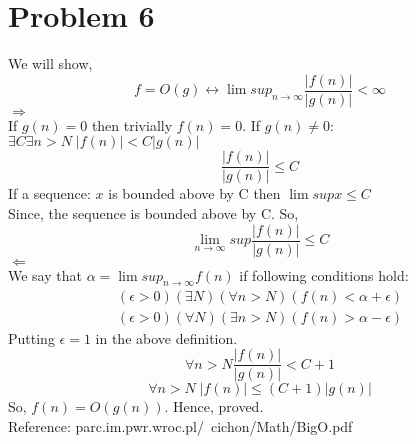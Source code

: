 \documentclass[paper=a4, fontsize=11pt]{scrartcl} %
\numberwithin{equation}{section} %
\numberwithin{figure}{section} %
\numberwithin{table}{section} %
\begin{document}
\section{Problem 6}
We will show, \\
\begin{equation}
	f=O(g)\leftrightarrow \lim sup_{n\rightarrow \infty}\frac{|f(n)|}{|g(n)|}<\infty
\end{equation}
$\Rightarrow$\\
If $g(n)=0$ then trivially $f(n)=0$. If $g(n)\neq 0:$\\
$\exists C \exists n>N \; |f(n)|<C|g(n)|$\\
\begin{equation}
\frac{|f(n)|}{|g(n)|}\leq C
\end{equation}
If a sequence: $x$ is bounded above by C then $\lim sup x\leq C$\\
Since, the sequence is bounded above by C. So, 
\begin{equation}
	\lim_{n\rightarrow\infty}sup \frac{|f(n)|}{|g(n)|}\leq C
\end{equation}
$\Leftarrow$\\
We say that $\alpha = \lim sup_{n\rightarrow \infty }f(n)$ if following conditions hold: 
\begin{align*}
	(\epsilon>0)(\exists N)(\forall n>N)(f(n)<\alpha+\epsilon)\\
	(\epsilon>0)(\forall N)(\exists n>N)(f(n)>\alpha-\epsilon)
\end{align*}
Putting $\epsilon = 1$ in the above definition. \\
\begin{equation}
	\forall n>N \frac{|f(n)|}{|g(n)|}<C+1
\end{equation}
\begin{equation}
	\forall n>N\; |f(n)|\leq(C+1)|g(n)|
\end{equation}
So, $f(n) = O(g(n))$. Hence, proved. \\
Reference: parc.im.pwr.wroc.pl/~cichon/Math/BigO.pdf
	
\end{document}
